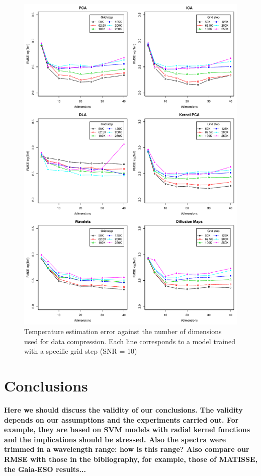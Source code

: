 \documentclass[a4paper,fleqn,usenatbib]{mnras}
\begin{document}
\begin{figure}
\centering\includegraphics[height=0.95\textheight]{bestSVM_Teff_N-RMSE_HR10_snr=10_all.pdf}
\caption{Temperature estimation error against the number of dimensions
  used for data compression. Each line corresponds to a model trained
  with a specific grid step (SNR = 10)}
\label{fig:grid10}
\end{figure}


\section{Conclusions}
\label{sec:conclusions}

{\bf Here we should discuss the validity of our conclusions. The
  validity depends on our assumptions and the experiments carried
  out. For example, they are based on SVM models with radial kernel
  functions and the implications should be stressed. Also the spectra
  were trimmed in a wavelength range: how is this range? Also compare
  our RMSE with those in the bibliography, for example, those of
  MATISSE, the Gaia-ESO results...}
\end{document}
